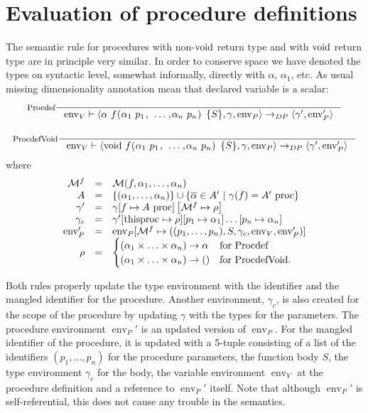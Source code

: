 \documentclass[a4paper, 10pt, draft]{report}
\DeclareMathOperator*{\env}{env}
\newcommand{\mycode}[1]{\ensuremath{\mbox{\lstinline{#1}}}}
\begin{document}
\section{Evaluation of procedure definitions}\label{sec:semantics:expr:procdefs}

The semantic rule for procedures with non-\mycode{void} return type and with
\mycode{void} return type are in principle very similar.  In order to conserve
space we have denoted the types on syntactic level, somewhat informally,
directly with $\alpha$, $\alpha_1$, etc.  As usual missing dimensionality
annotation mean that declared variable is a scalar:
\[\begin{array}{c}
\inference[Procdef]{}{
  \env_V |- \left< \alpha\ f\mycode{(} \alpha_1\ p_1 \mycode{,}\  \ldots \mycode{,} \alpha_n\ p_n \mycode{) \{} S \mycode{\}} , \gamma, \env_P \right> \to_{DP} \left< \gamma', \env'_P \right>
}\\[2em]
\inference[ProcdefVoid]{}{
  \env_V |- \left< \mycode{void}\ f\mycode{(} \alpha_1\ p_1 \mycode{,}\  \ldots \mycode{,} \alpha_n\ p_n \mycode{) \{} S \mycode{\}}, \gamma, \env_P \right> \to_{DP} \left< \gamma', \env'_P \right>
}\end{array}\]
where \[\begin{array}{rcl}
  \mathcal{M}^f
            & = & \mathcal{M}(f, \alpha_1, \ldots, \alpha_n) \\
  A         & = &
      \left\{ (\alpha_1,\ldots,\alpha_n) \right\} \cup
      \left\{ \overline{\alpha} \in A'\ |\ \gamma(f) = A'\ \mycode{proc} \right\} \\
  \gamma'   & = & \gamma[f \mapsto A\ \mycode{proc}]\left[ \mathcal{M}^f \mapsto \rho \right] \\
  \gamma_c  & = & \gamma'[\mycode{thisproc} \mapsto \rho][p_1 \mapsto \alpha_1]\ldots[p_n \mapsto \alpha_n] \\
  \env'_P   & = & \env_P[\mathcal{M}^f \mapsto ( (p_1,\ldots,p_n), S, \gamma_c, \env_V, \env'_P)] \\
  \rho      & = & \begin{cases}
     (\alpha_1\times\ldots\times\alpha_n)\to\alpha & \text{for Procdef} \\
     (\alpha_1\times\ldots\times\alpha_n)\to() & \text{for ProcdefVoid}.
  \end{cases}
\end{array} \]

Both rules properly update the type environment with the identifier and the
mangled identifier for the procedure. Another environment, $\gamma_c$, is also
created for the scope of the procedure by updating $\gamma$ with the types for
the parameters. The procedure environment $\operatorname{env}_P'$ is an updated
version of $\operatorname{env}_P$. For the mangled identifier of the procedure,
it is updated with a 5-tuple consisting of a list of the identifiers $\left(
p_1, \ldots, p_n \right)$ for the procedure parameters, the function body $S$,
the type environment $\gamma_c$ for the body, the variable environment
$\operatorname{env}_V$ at the procedure definition and a reference to
$\operatorname{env}_P'$ itself. Note that although $\operatorname{env}_P'$ is
self-referential, this does not cause any trouble in the semantics.
\end{document}
